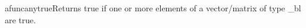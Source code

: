 afunc{anytrue}{Returns true if one or more elements of a vector/matrix of type _bl are true.}
\\\cvsiplh
\\\pyjvsiph